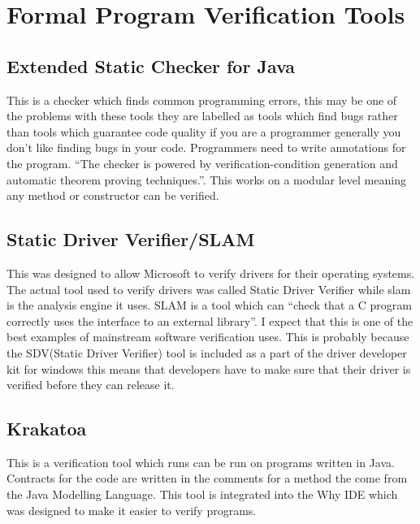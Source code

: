 \documentclass[a4paper,12pt]{scrartcl}
\begin{document}
	\section{Formal Program Verification Tools}
	{
		\subsection{Extended Static Checker for Java\cite{Flanagan2002}}
		{
			This is a checker which finds common programming errors, this may be one of the problems with these tools they are labelled as tools which find bugs rather than tools which guarantee code quality if you are a programmer generally you don't like finding bugs in your code. Programmers need to write annotations for the program. \enquote{The checker is powered by verification-condition generation and automatic theorem proving techniques.}\cite{Flanagan2002}. This works on a modular level meaning any method or constructor can be verified.
		}
		\subsection{Static Driver Verifier/SLAM\cite{Ball2004}}
		{
			This was designed to allow Microsoft to verify drivers for their operating systems. The actual tool used to verify drivers was called Static Driver Verifier while slam is the analysis engine it uses. SLAM is a tool which can \enquote{check that a C program correctly uses the interface to an external library}\cite{Ball2004}. I expect that this is one of the best examples of mainstream software verification uses. This is probably because the SDV(Static Driver Verifier) tool is included as a part of the driver developer kit for windows this means that developers have to make sure that their driver is verified before they can release it.
		}
		
		\subsection{Krakatoa \cite{Marche2018,Filliatre2007}}\label{sec:krakatoa}
		{
			This is a verification tool which runs can be run on programs written in Java. Contracts for the code are written in the comments for a method the come from the Java Modelling Language\cite{Burdy2004}. This tool is integrated into the Why IDE which was designed to make it easier to verify programs.
		}
		
	}
	
\end{document}
